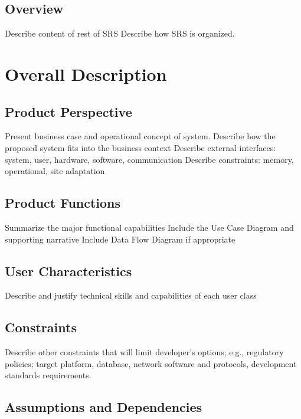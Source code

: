 \documentclass[a4paper,12pt]{scrreprt}
\begin{document}
\section{Overview}
Describe content of rest of SRS 
Describe how SRS is organized.



\chapter{Overall Description}

\section{Product Perspective}
Present business case and operational concept of system.
Describe how the proposed system fits into the business context
Describe external interfaces: system, user, hardware, software, communication
Describe constraints: memory, operational, site adaptation


\section{Product Functions}
Summarize the major functional capabilities
Include the Use Case Diagram and supporting narrative
Include Data Flow Diagram if appropriate


\section{User Characteristics}
Describe and justify technical skills and capabilities of each user class


\section{Constraints}
Describe other constraints that will limit developer’s options; e.g., regulatory policies; target platform, database, network software and protocols, development standards requirements.

\section{Assumptions and Dependencies}

\end{document}
